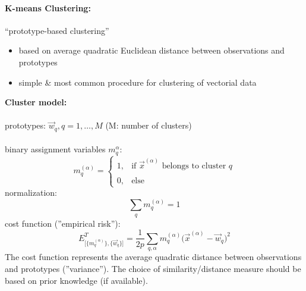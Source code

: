 \paragraph{K-means Clustering:} ``prototype-based clustering''
\label{sec:kmeans}
\begin{itemize}
\item based on average quadratic Euclidean distance between observations and prototypes
\item simple \& most common procedure for clustering of vectorial data
\end{itemize}
\textbf{Cluster model:}\\\\
prototypes: $\vec{w}_q, q = 1, \ldots, M$ \qquad\qquad (M: number of clusters)
\\\\
binary assignment variables $m_q^{\alpha}$:
\begin{equation}
	m_q^{(\alpha)} = \left\{ \begin{array}{ll}
		1, & \text{if } \vec{x}^{(\alpha)} \text{ belongs to cluster } q
		\\\\
		0, & \text{else}
	\end{array} \right. 
\end{equation}
normalization:
\begin{equation}
	\sum\limits_q m_q^{(\alpha)} = 1
\end{equation}
cost function (''empirical risk''):
\begin{equation}\label{eq:euclideanClusterCost}
	E_{ \big[ \big\{ m_q^{(\alpha)} \big\}, \big\{ \vec{w}_q \big\} 
		\big] }^T = \frac{1}{2p} \sum\limits_{q,\alpha} m_q^{(\alpha)}
		\big( \vec{x}^{(\alpha)} - \vec{w}_q \big)^2
\end{equation}
The cost function represents the average quadratic distance between
observations and prototypes (''variance''). The choice of
similarity/distance measure should be based on prior knowledge (if available). 

